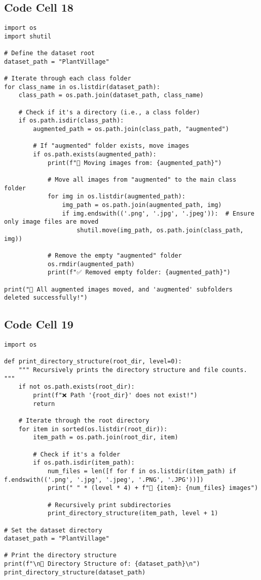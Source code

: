 \documentclass{article}
\begin{document}
\subsection*{Code Cell 18}
\begin{lstlisting}
import os
import shutil

# Define the dataset root
dataset_path = "PlantVillage"

# Iterate through each class folder
for class_name in os.listdir(dataset_path):
    class_path = os.path.join(dataset_path, class_name)

    # Check if it's a directory (i.e., a class folder)
    if os.path.isdir(class_path):
        augmented_path = os.path.join(class_path, "augmented")

        # If "augmented" folder exists, move images
        if os.path.exists(augmented_path):
            print(f"📂 Moving images from: {augmented_path}")

            # Move all images from "augmented" to the main class folder
            for img in os.listdir(augmented_path):
                img_path = os.path.join(augmented_path, img)
                if img.endswith(('.png', '.jpg', '.jpeg')):  # Ensure only image files are moved
                    shutil.move(img_path, os.path.join(class_path, img))

            # Remove the empty "augmented" folder
            os.rmdir(augmented_path)
            print(f"✅ Removed empty folder: {augmented_path}")

print("🎯 All augmented images moved, and 'augmented' subfolders deleted successfully!")
\end{lstlisting}

\subsection*{Code Cell 19}
\begin{lstlisting}
import os

def print_directory_structure(root_dir, level=0):
    """ Recursively prints the directory structure and file counts. """
    if not os.path.exists(root_dir):
        print(f"❌ Path '{root_dir}' does not exist!")
        return

    # Iterate through the root directory
    for item in sorted(os.listdir(root_dir)):
        item_path = os.path.join(root_dir, item)

        # Check if it's a folder
        if os.path.isdir(item_path):
            num_files = len([f for f in os.listdir(item_path) if f.endswith(('.png', '.jpg', '.jpeg', '.PNG', '.JPG'))])
            print(" " * (level * 4) + f"📁 {item}: {num_files} images")

            # Recursively print subdirectories
            print_directory_structure(item_path, level + 1)

# Set the dataset directory
dataset_path = "PlantVillage"

# Print the directory structure
print(f"\n📂 Directory Structure of: {dataset_path}\n")
print_directory_structure(dataset_path)
\end{lstlisting}
\end{document}
